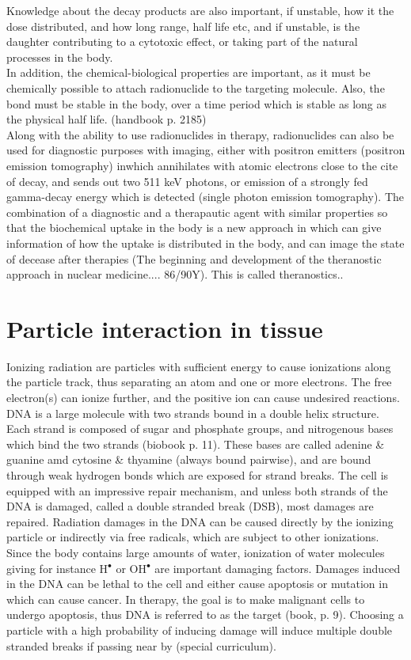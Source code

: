 Knowledge about the decay products are also important, if unstable, how it the dose distributed, and how long range, half life etc, and if unstable, is the daughter contributing to a cytotoxic effect, or taking part of the natural processes in the body. \\

In addition, the chemical-biological properties are important, as it must be chemically possible to attach radionuclide to the targeting molecule. Also, the bond must be stable in the body, over a time period which is stable as long as the physical half life. (handbook p. 2185)\\ 

\noindent
Along with the ability to use radionuclides in therapy, radionuclides can also be used for diagnostic purposes with imaging, either with positron emitters (positron emission tomography) inwhich annihilates with atomic electrons close to the cite of decay, and sends out two 511 keV photons, or emission of a strongly fed gamma-decay energy which is detected (single photon emission tomography). The combination of a diagnostic and a therapautic agent with similar properties so that the biochemical uptake in the body is a new approach in which can give information of how the uptake is distributed in the body, and can image the state of decease after therapies (The beginning and development of the theranostic approach in nuclear medicine.... 86/90Y). This is called theranostics.. 

\section{Particle interaction in tissue}

Ionizing radiation are particles with sufficient energy to cause ionizations along the particle track, thus separating an atom and one or more electrons. The free electron(s) can ionize further, and the positive ion can cause undesired reactions. DNA is a large molecule with two strands bound in a double helix structure. Each strand is composed of sugar and phosphate groups, and nitrogenous bases which bind the two strands (biobook p. 11). These  bases are called adenine \& guanine amd cytosine \& thyamine (always bound pairwise), and are bound through weak hydrogen bonds which are exposed for strand breaks. The cell is equipped with an impressive repair mechanism, and unless both strands of the DNA is damaged, called a double stranded break (DSB), most damages are repaired. Radiation damages in the DNA can be caused directly by the ionizing particle or indirectly via free radicals, which are subject to other ionizations. Since the body contains large amounts of water, ionization of water molecules giving for instance H$^\bullet$ or OH$^\bullet$ are important damaging factors. Damages induced in the DNA can be lethal to the cell and either cause apoptosis or mutation in which can cause cancer. In therapy, the goal is to make malignant cells to undergo apoptosis, thus DNA is referred to as the target (book, p. 9). Choosing a particle with a high probability of inducing damage will induce multiple double stranded breaks if passing near by (special curriculum). 

